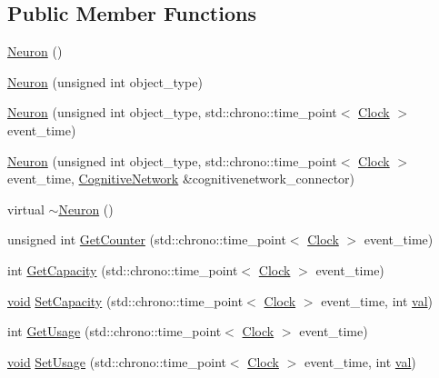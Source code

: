 \subsection*{Public Member Functions}
\begin{DoxyCompactItemize}
\item 
\mbox{\hyperlink{class_neuron_a823487d01615fadb8ac19a2768dd9d96}{Neuron}} ()
\item 
\mbox{\hyperlink{class_neuron_acbc433cac4f27aa7f4e05be26c336aa5}{Neuron}} (unsigned int object\+\_\+type)
\item 
\mbox{\hyperlink{class_neuron_a4611499895417d44250c452d0fc719a6}{Neuron}} (unsigned int object\+\_\+type, std\+::chrono\+::time\+\_\+point$<$ \mbox{\hyperlink{universe_8h_a0ef8d951d1ca5ab3cfaf7ab4c7a6fd80}{Clock}} $>$ event\+\_\+time)
\item 
\mbox{\hyperlink{class_neuron_a6839febd20fb8f776151e00142411a56}{Neuron}} (unsigned int object\+\_\+type, std\+::chrono\+::time\+\_\+point$<$ \mbox{\hyperlink{universe_8h_a0ef8d951d1ca5ab3cfaf7ab4c7a6fd80}{Clock}} $>$ event\+\_\+time, \mbox{\hyperlink{class_cognitive_network}{Cognitive\+Network}} \&cognitivenetwork\+\_\+connector)
\item 
virtual \mbox{\hyperlink{class_neuron_aecd41febe74ef417230cd74af0c8b801}{$\sim$\+Neuron}} ()
\item 
unsigned int \mbox{\hyperlink{class_neuron_a0b5fe55bf939808986b3697d18a834f4}{Get\+Counter}} (std\+::chrono\+::time\+\_\+point$<$ \mbox{\hyperlink{universe_8h_a0ef8d951d1ca5ab3cfaf7ab4c7a6fd80}{Clock}} $>$ event\+\_\+time)
\item 
int \mbox{\hyperlink{class_neuron_a93cce70c19c8e70accaa31908d3f29f6}{Get\+Capacity}} (std\+::chrono\+::time\+\_\+point$<$ \mbox{\hyperlink{universe_8h_a0ef8d951d1ca5ab3cfaf7ab4c7a6fd80}{Clock}} $>$ event\+\_\+time)
\item 
\mbox{\hyperlink{glad_8h_a950fc91edb4504f62f1c577bf4727c29}{void}} \mbox{\hyperlink{class_neuron_a8f5766ea61dc46b7a25361df540755ec}{Set\+Capacity}} (std\+::chrono\+::time\+\_\+point$<$ \mbox{\hyperlink{universe_8h_a0ef8d951d1ca5ab3cfaf7ab4c7a6fd80}{Clock}} $>$ event\+\_\+time, int \mbox{\hyperlink{glad_8h_a26942fd2ed566ef553eae82d2c109c8f}{val}})
\item 
int \mbox{\hyperlink{class_neuron_a745b090da1b8f8fc7e3cf0ca06dfb117}{Get\+Usage}} (std\+::chrono\+::time\+\_\+point$<$ \mbox{\hyperlink{universe_8h_a0ef8d951d1ca5ab3cfaf7ab4c7a6fd80}{Clock}} $>$ event\+\_\+time)
\item 
\mbox{\hyperlink{glad_8h_a950fc91edb4504f62f1c577bf4727c29}{void}} \mbox{\hyperlink{class_neuron_abf99856ac41b5c9c4948b3204bbc1590}{Set\+Usage}} (std\+::chrono\+::time\+\_\+point$<$ \mbox{\hyperlink{universe_8h_a0ef8d951d1ca5ab3cfaf7ab4c7a6fd80}{Clock}} $>$ event\+\_\+time, int \mbox{\hyperlink{glad_8h_a26942fd2ed566ef553eae82d2c109c8f}{val}})

\end{DoxyCompactItemize}
